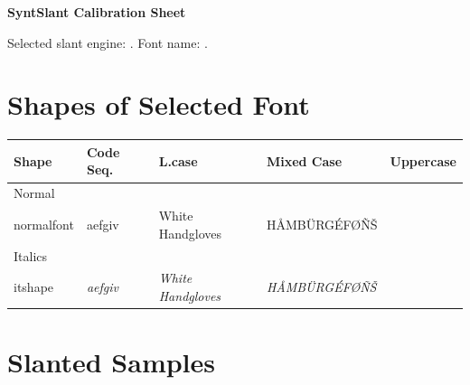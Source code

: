 \documentclass[a4paper]{article}
\newcommand*{\cs}[1]{\texttt{\char`\\#1}}
\newcommand*{\fontsample}{aefgiv}
\newcommand*{\FontSample}{White Handgloves}
\newcommand*{\FONTSAMPLE}{H\AA{}MB\"URG\'EF\O{}\~N\v{S}}
\begin{document}
{\huge\sf\bfseries SyntSlant Calibration Sheet\par\bigskip}

Selected slant engine: \makeatletter\synthslant@engine@name\makeatother.
Font name: \fontname\font.

\section{Shapes of Selected Font}

\begin{center}
  \begin{tabular}{@{}lllll@{}}
    \toprule
    Shape  &  Code Seq.  &  L.case  &  Mixed Case   &  Uppercase  \\
    \midrule
    Normal  &
    \cs{normalfont}  &  {\normalfont\fontsample}  &  {\normalfont\FontSample}  &  {\normalfont\FONTSAMPLE}  \\
    Italics  &
    \cs{itshape}  &  {\itshape\fontsample}  &  {\itshape\FontSample}  &  {\itshape\FONTSAMPLE}  \\
    \bottomrule
  \end{tabular}
\end{center}

\section{Slanted Samples}
\end{document}
